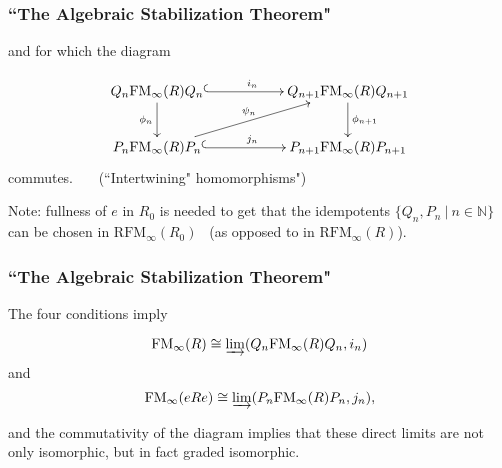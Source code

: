 \documentclass{beamer}
\begin{document}
   


\begin{frame}
\frametitle{``The Algebraic Stabilization Theorem"}






and for which the diagram
    
    \[
    \xymatrix{
    Q_n {\rm FM}_\infty(R) Q_n \ar@{^{(}->}[rr]^{i_n} \ar[d]_-{\phi_n} & &  Q_{n+1} {\rm FM}_\infty(R) Q_{n+1} \ar[d]^-{\phi_{n+1}}  \\
     P_{n} {\rm FM}_\infty(R) P_n \ar[urr]^-{\psi_n} \ar@{^{(}->}[rr]^{j_n} & & P_{n+1} {\rm FM}_\infty(R) P_{n+1}
    }
    \]
    commutes.      \ \ \ (``Intertwining" homomorphisms")  
    
    \pause
    \bigskip
    
    
   
    
Note:  fullness of $e$ in $R_0$ is needed to get  that the idempotents   $\{Q_n, P_n \ | \ n\in \mathbb{N}\}$ can be chosen in  $\mathrm{RFM}_\infty(R_0)$ \ (as opposed to in $\mathrm{RFM}_\infty(R)$). 
 
    
    \end{frame}


\begin{frame}
\frametitle{``The Algebraic Stabilization Theorem"}



The four conditions  imply

$${\rm FM}_\infty(R) \cong \varinjlim ( Q_n {\rm FM}_\infty(R) Q_n , i_n )  $$ 
and
$${\rm FM}_\infty(eRe) \cong \varinjlim ( P_n {\rm FM}_\infty(R) P_n , j_n ),$$

\medskip

and the commutativity of the diagram  implies that these direct limits are not only isomorphic, but in fact graded isomorphic. 
        

   \end{frame}
\end{document}
